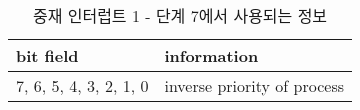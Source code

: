 %
%
\begin{table}[htbp]
\caption{중재 인터럽트 1 - 단계 7에서 사용되는 정보}\label{table:arb-int-p7}
   \begin{center}
   \begin{tabular}{|l|l|} \hline
	bit field & information \\
\hline \hline
	7, 6, 5, 4, 3, 2, 1, 0 & inverse priority of process \\
\hline
   \end{tabular}
   \end{center}
\end{table}
%
%
